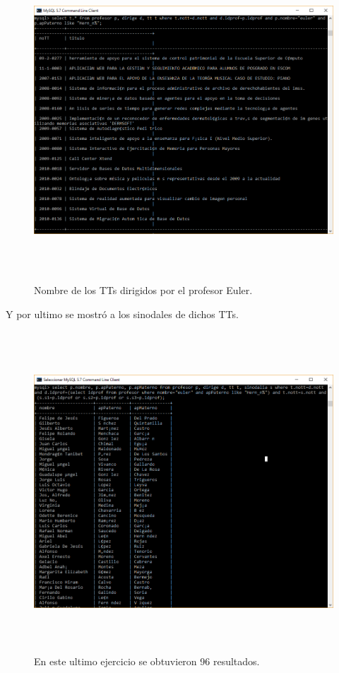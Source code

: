\documentclass[12pt, titlepage]{article}
\begin{document}
	\begin{figure}[H]
		\begin{center}
			\includegraphics[width=16cm, height=12cm]{img/ultimo1.png}
			\caption{Nombre de los TTs dirigidos por el profesor Euler.} 
			\label{fig:ejercicio11}
		\end{center}
	\end{figure}
	
	Y por ultimo se mostró a los sinodales de dichos TTs.
	\begin{figure}[H]
		\begin{center}
			\includegraphics[width=16cm, height=12cm]{img/ultimo.png}
			\caption{En este ultimo ejercicio se obtuvieron 96 resultados.} 
			\label{fig:ultimo}
		\end{center}
	\end{figure}
\end{document}
